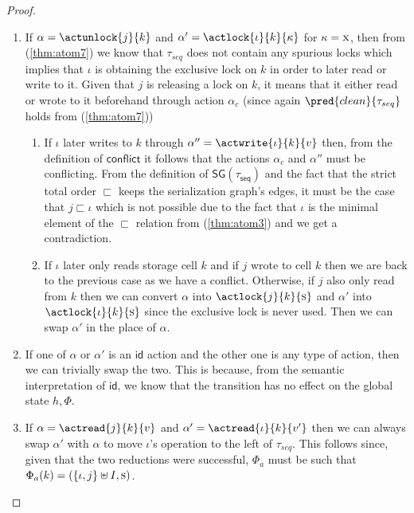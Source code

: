 \begin{thm}
{\begin{proof}
\begin{enumerate}[label=({\roman*})]
	\item If $\alpha = \actunlock{j}{k}$ and $\alpha' = \actlock{\iota}{k}{\kappa}$ for $\kappa = \textsc{x}$, then from (\ref{thm:atom7}) we know that $\tau_{seq}$ does not contain any spurious locks which implies that $\iota$ is obtaining the exclusive lock on $k$ in order to later read or write to it. Given that $j$ is releasing a lock on $k$, it means that it either read or wrote to it beforehand through action $\alpha_c$ (since again $\pred{clean}{\tau_{seq}}$ holds from (\ref{thm:atom7}))
	\begin{enumerate}
		\item \label{thm:atom8a} If $\iota$ later writes to $k$ through $\alpha'' = \actwrite{\iota}{k}{v}$ then, from the definition of $\mathsf{conflict}$ it follows that the actions $\alpha_c$ and $\alpha''$ must be conflicting. From the definition of $\mathsf{SG(\tau_{seq})}$ and the fact that the strict total order $\sqsubset$ keeps the serialization graph's edges, it must be the case that $j \sqsubset \iota$ which is not possible due to the fact that $\iota$ is the minimal element of the $\sqsubset$ relation from (\ref{thm:atom3}) and we get a contradiction.
		
		\item If $\iota$ later only reads storage cell $k$ and if $j$ wrote to cell $k$ then we are back to the previous case as we have a conflict. Otherwise, if $j$ also only read from $k$ then we can convert $\alpha$ into $\actlock{j}{k}{\textsc{s}}$ and $\alpha'$ into $\actlock{\iota}{k}{\textsc{s}}$ since the exclusive lock is never used. Then we can swap $\alpha'$ in the place of $\alpha$.
	\end{enumerate}

	\item If one of $\alpha$ or $\alpha'$ is an $\mathsf{id}$ action and the other one is any type of action, then we can trivially swap the two. This is because, from the semantic interpretation of $\mathsf{id}$, we know that the transition has no effect on the global state $h, \Phi$.
	
	\item If $\alpha = \actread{j}{k}{v}$ and $\alpha' = \actread{\iota}{k}{v'}$ then we can always swap $\alpha'$ with $\alpha$ to move $\iota$'s operation to the left of $\tau_{seq}$. This follows since, given that the two reductions were successful, $\Phi_a$ must be such that $\Phi_a(k) = (\{\iota, j\} \uplus I, \textsc{s})$.
	

\end{enumerate}
\end{proof}}
\end{thm}
